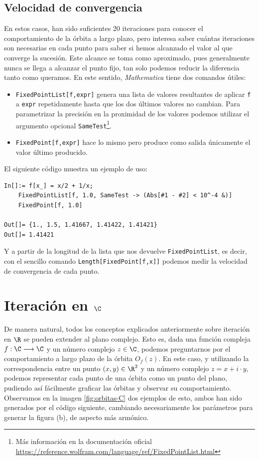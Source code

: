 \subsection{Velocidad de convergencia}

En estos casos, han sido suficientes 20 iteraciones para conocer el comportamiento de la órbita a largo plazo, pero interesa saber cuántas iteraciones son necesarias en cada punto para saber si hemos alcanzado el valor al que converge la sucesión. Este alcance se toma como aproximado, pues generalmente nunca se llega a alcanzar el punto fijo, tan solo podemos reducir la diferencia tanto como queramos. En este sentido, \textit{Mathematica} tiene dos comandos útiles:

\begin{itemize}
    \item \verb|FixedPointList[f,expr]| genera una lista de valores resultantes de aplicar \verb|f| a \verb|expr| repetidamente hasta que los dos últimos valores no cambian. Para parametrizar la precisión en la proximidad de los valores podemos utilizar el argumento opcional \verb|SameTest|\footnote{Más información en la documentación oficial \url{https://reference.wolfram.com/language/ref/FixedPointList.html}}.
    \item \verb|FixedPoint[f,expr]| hace lo mismo pero produce como salida únicamente el valor último producido.
\end{itemize}

El siguiente código muestra un ejemplo de uso:

\begin{verbatim}
In[]:= f[x_] = x/2 + 1/x;
    FixedPointList[f, 1.0, SameTest -> (Abs[#1 - #2] < 10^-4 &)]
    FixedPoint[f, 1.0]

Out[]= {1., 1.5, 1.41667, 1.41422, 1.41421}
Out[]= 1.41421
\end{verbatim}

Y a partir de la longitud de la lista que nos devuelve \verb|FixedPointList|, es decir, con el sencillo comando \verb|Length[FixedPoint[f,x]]| podemos medir la velocidad de convergencia de cada punto.

\section{Iteración en $\C$}

De manera natural, todos los conceptos explicados anteriormente sobre iteración en $\R$ se pueden extender al plano complejo. Esto es, dada una función compleja $f:\C\longrightarrow\C$ y un número complejo $z\in\C$, podemos preguntarnos por el comportamiento a largo plazo de la órbita $O_f(z)$. En este caso, y utilizando la correspondencia entre un punto $(x,y)\in\R^2$ y un número complejo $z=x+i\cdot y$, podemos representar cada punto de una órbita como un punto del plano, pudiendo así fácilmente graficar las órbitas y observar su comportamiento. Observamos en la imagen \ref{fig:orbitas-C} dos ejemplos de esto, ambos han sido generados por el código siguiente, cambiando necesariamente los parámetros para generar la figura (b), de aspecto más armónico.


